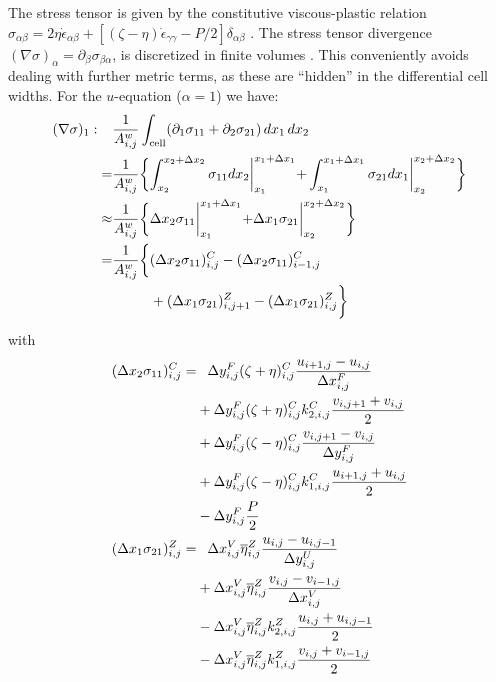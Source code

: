 The stress tensor is given by the constitutive viscous-plastic
relation $\sigma_{\alpha\beta} = 2\eta\dot{\epsilon}_{\alpha\beta} +
[(\zeta-\eta)\dot{\epsilon}_{\gamma\gamma} - P/2
]\delta_{\alpha\beta}$ \citep{hib79}. The stress tensor divergence
$(\nabla\sigma)_{\alpha} = \partial_\beta\sigma_{\beta\alpha}$, is
discretized in finite volumes \citep[see
also][]{losch10:_mitsim}. This conveniently avoids dealing with
further metric terms, as these are ``hidden'' in the differential cell
widths. For the $u$-equation ($\alpha=1$) we have:
\begin{align}
  (\nabla\sigma)_{1}: \phantom{=}&
  \frac{1}{A_{i,j}^w}
  \int_{\mathrm{cell}}(\partial_1\sigma_{11}+\partial_2\sigma_{21})\,dx_1\,dx_2
  \\\notag
  =& \frac{1}{A_{i,j}^w} \biggl\{
  \int_{x_2}^{x_2+\Delta{x}_2}\sigma_{11}dx_2\biggl|_{x_{1}}^{x_{1}+\Delta{x}_{1}}
  + \int_{x_1}^{x_1+\Delta{x}_1}\sigma_{21}dx_1\biggl|_{x_{2}}^{x_{2}+\Delta{x}_{2}}
  \biggr\} \\ \notag
  \approx& \frac{1}{A_{i,j}^w} \biggl\{
  \Delta{x}_2\sigma_{11}\biggl|_{x_{1}}^{x_{1}+\Delta{x}_{1}}
  + \Delta{x}_1\sigma_{21}\biggl|_{x_{2}}^{x_{2}+\Delta{x}_{2}}
  \biggr\} \\ \notag
  =& \frac{1}{A_{i,j}^w} \biggl\{
  (\Delta{x}_2\sigma_{11})_{i,j}^C -
  (\Delta{x}_2\sigma_{11})_{i-1,j}^C 
  \\\notag
  \phantom{=}& \phantom{\frac{1}{A_{i,j}^w} \biggl\{}
  + (\Delta{x}_1\sigma_{21})_{i,j+1}^Z - (\Delta{x}_1\sigma_{21})_{i,j}^Z
  \biggr\}
\end{align}
with
\begin{align}
  (\Delta{x}_2\sigma_{11})_{i,j}^C =& \phantom{+}
  \Delta{y}_{i,j}^{F}(\zeta + \eta)^{C}_{i,j}
  \frac{u_{i+1,j}-u_{i,j}}{\Delta{x}_{i,j}^{F}} \\ \notag
  &+ \Delta{y}_{i,j}^{F}(\zeta + \eta)^{C}_{i,j}
  k_{2,i,j}^C \frac{v_{i,j+1}+v_{i,j}}{2} \\ \notag
  \phantom{=}& + \Delta{y}_{i,j}^{F}(\zeta - \eta)^{C}_{i,j}
  \frac{v_{i,j+1}-v_{i,j}}{\Delta{y}_{i,j}^{F}} \\ \notag
  \phantom{=}& + \Delta{y}_{i,j}^{F}(\zeta - \eta)^{C}_{i,j}
  k_{1,i,j}^{C}\frac{u_{i+1,j}+u_{i,j}}{2} \\ \notag
  \phantom{=}& - \Delta{y}_{i,j}^{F} \frac{P}{2} \\
  (\Delta{x}_1\sigma_{21})_{i,j}^Z =& \phantom{+}
  \Delta{x}_{i,j}^{V}\overline{\eta}^{Z}_{i,j}
  \frac{u_{i,j}-u_{i,j-1}}{\Delta{y}_{i,j}^{U}} \\ \notag
  & + \Delta{x}_{i,j}^{V}\overline{\eta}^{Z}_{i,j}
  \frac{v_{i,j}-v_{i-1,j}}{\Delta{x}_{i,j}^{V}} \\ \notag
  & - \Delta{x}_{i,j}^{V}\overline{\eta}^{Z}_{i,j} 
  k_{2,i,j}^{Z}\frac{u_{i,j}+u_{i,j-1}}{2} \\ \notag
  & - \Delta{x}_{i,j}^{V}\overline{\eta}^{Z}_{i,j} 
  k_{1,i,j}^{Z}\frac{v_{i,j}+v_{i-1,j}}{2}
\end{align}

